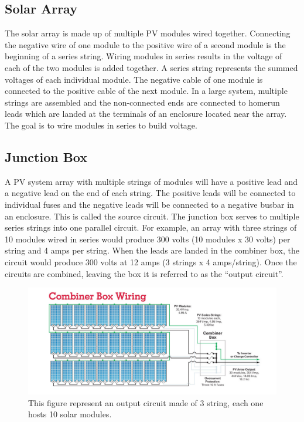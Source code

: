 \subsection{Solar Array}
The solar array is made up of multiple PV modules wired
together. Connecting the negative wire of one module to
the positive wire of a second module is the beginning of a
series string\cite{pvarizona}. Wiring modules in series results in the voltage of
each of the two modules is added together. A series string represents the summed voltages of each
individual module. The negative cable of one module is connected
to the positive cable of the next module. In a large system,
multiple strings are assembled and the non-connected ends are
connected to homerun leads which are landed at the terminals
of an enclosure located near the array.
The goal is to wire modules in series to build voltage.

\subsection{Junction Box}
A PV system array with multiple strings of modules will
have a positive lead and a negative lead on the end of each
string. The positive leads will be connected to individual
fuses and the negative leads will be connected to a negative
busbar in an enclosure. This is called the source circuit\cite{pvarizona}. The
junction box serves to  multiple series strings into
one parallel circuit. For example, an array with three strings
of 10 modules wired in series would produce 300 volts (10
modules x 30 volts) per string and 4 amps per string. When
the leads are landed in the combiner box, the circuit would
produce 300 volts at 12 amps (3 strings x 4 amps/string). Once
the circuits are combined, leaving the box it is referred to as
the “output circuit”.

\begin{figure}[H]
	\centering
	\includegraphics[width=\textwidth, keepaspectratio]{chapters/1_introduction/imgs/junctionbox.png}
	\caption{This figure represent an output circuit made of 3 string, each one hosts 10 solar modules\cite{pvarizona}.}
	\label{fig:outcircuit}
\end{figure}

